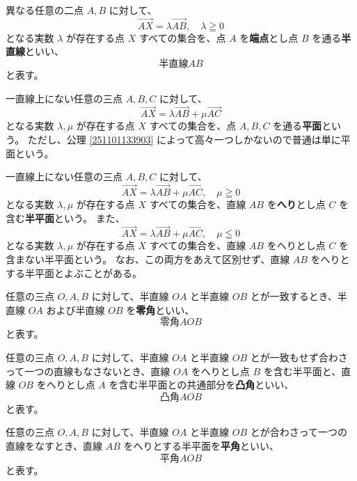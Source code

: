 \begin{dfn}[半直線、端点]
  異なる任意の二点 \(A,B\) に対して、
  \[\overrightarrow{AX}=\lambda\overrightarrow{AB},\quad \lambda\geqq0\]
  となる実数 \(\lambda\) が存在する点 \(X\) すべての集合を、点 \(A\) を\textbf{端点}とし点 \(B\) を通る\textbf{半直線}といい、
  \[\text{半直線} AB\]
   と表す。
\end{dfn}

\begin{dfn}[平面]
  一直線上にない任意の三点 \(A,B,C\) に対して、
  \[\overrightarrow{AX}=\lambda\overrightarrow{AB}+\mu\overrightarrow{AC}\]
  となる実数 \(\lambda,\mu\) が存在する点 \(X\) すべての集合を、点 \(A,B,C\) を通る\textbf{平面}という。
  ただし、公理 \ref{251101133903} によって高々一つしかないので普通は単に平面という。
\end{dfn}

\begin{dfn}[半平面、へり]
  一直線上にない任意の三点 \(A,B,C\) に対して、
  \[\overrightarrow{AX}=\lambda\overrightarrow{AB}+\mu\overrightarrow{AC},\quad \mu\geqq0\]
  となる実数 \(\lambda,\mu\) が存在する点 \(X\) すべての集合を、直線 \(AB\) を\textbf{へり}とし点 \(C\) を含む\textbf{半平面}という。
  また、
  \[\overrightarrow{AX}=\lambda\overrightarrow{AB}+\mu\overrightarrow{AC},\quad \mu\leqq0\]
  となる実数 \(\lambda,\mu\) が存在する点 \(X\) すべての集合を、直線 \(AB\) をへりとし点 \(C\) を含まない半平面という。
  なお、この両方をあえて区別せず、直線 \(AB\) をへりとする半平面とよぶことがある。
\end{dfn}

\begin{dfn}[零角]
  任意の三点 \(O,A,B\) に対して、半直線 \(OA\) と半直線 \(OB\) とが一致するとき、半直線 \(OA\) および半直線 \(OB\) を\textbf{零角}といい、
  \[\text{零角} AOB\]
  と表す。
\end{dfn}

\begin{dfn}[凸角]
  任意の三点 \(O,A,B\) に対して、半直線 \(OA\) と半直線 \(OB\) とが一致もせず合わさって一つの直線もなさないとき、直線 \(OA\) をへりとし点 \(B\) を含む半平面と、直線 \(OB\) をへりとし点 \(A\) を含む半平面との共通部分を\textbf{凸角}といい、
  \[\text{凸角} AOB\]
  と表す。
\end{dfn}

\begin{dfn}[平角]
  任意の三点 \(O,A,B\) に対して、半直線 \(OA\) と半直線 \(OB\) とが合わさって一つの直線をなすとき、直線 \(AB\) をへりとする半平面を\textbf{平角}といい、
  \[\text{平角} AOB\]
  と表す。
\end{dfn}

